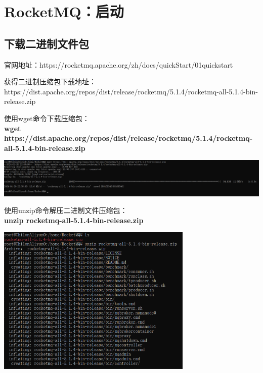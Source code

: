 \documentclass[11pt, a4paper, oneside, fontset=none]{ctexbook}
\begin{document}
\chapter{RocketMQ：启动}
\section{下载二进制文件包}
官网地址：https://rocketmq.apache.org/zh/docs/quickStart/01quickstart

获得二进制压缩包下载地址：\\https://dist.apache.org/repos/dist/release/rocketmq/5.1.4/rocketmq-all-5.1.4-bin-release.zip

使用wget命令下载压缩包：\\{\bfseries\kaishu wget https://dist.apache.org/repos/dist/release/rocketmq/5.1.4/rocketmq-all-5.1.4-bin-release.zip}
\begin{center}
  \begin{minipage}{\textwidth}
    \center
    \includegraphics[width=\textwidth]{picture/下载二进制文件.png}
    \captionsetup{hypcap=false}
    \label{fig:下载二进制压缩包}
  \end{minipage}
\end{center}

使用unzip命令解压二进制文件压缩包：\\{\bfseries\kaishu unzip rocketmq-all-5.1.4-bin-release.zip}
\begin{center}
  \begin{minipage}{\textwidth}
    \center
    \includegraphics[width=0.7\textwidth]{picture/解压二进制文件.png}
    \captionsetup{hypcap=false}
    \label{fig:解压二进制文件}
  \end{minipage}
\end{center}
\end{document}
